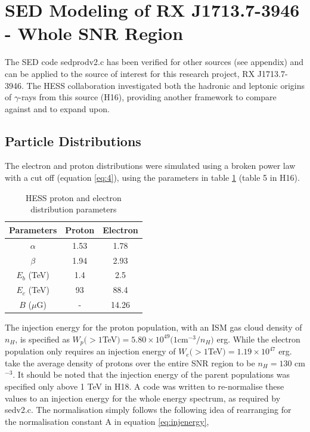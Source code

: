 \documentclass[12pt,a4paper]{article}
\begin{document}
\newpage
\section{SED Modeling of RX J1713.7-3946 - Whole SNR Region} \label{sec:seds}


The SED code sedprodv2.c has been verified for other sources (see appendix) and can be applied to the source of interest for this research project, RX J1713.7-3946. The HESS collaboration investigated both the hadronic and leptonic origins of $\gamma$-rays from this source (H16), providing another framework to compare against and to expand upon. 

\subsection{Particle Distributions}
The electron and proton distributions were simulated using a broken power law with a cut off (equation \ref{eq:4}), using the parameters in table \ref{tab:paramshess} (table 5 in H16).
\begin{table}[H] 
	\begin{center}
		\begin{tabular}{ccc}
			\toprule
			Parameters & Proton & Electron \\ 
			\hline 
			$\alpha$& 1.53 & 1.78 \\ 
			$\beta$& 1.94 & 2.93 \\ 
			$E_{b}$ (TeV)& 1.4 & 2.5 \\ 
			$E_{c}$ (TeV)& 93 & 88.4 \\ 
			$B$ ($\mu$G) & - & 14.26\\
			\bottomrule
		\end{tabular} 
	\end{center}
	\caption{HESS proton and electron distribution parameters}
	\label{tab:paramshess}
\end{table}
The injection energy for the proton population, with an ISM gas cloud density of $n_H$, is specified as $W_p(>1 $TeV$) = 5.80 \times 10^{49}(1 $cm$^{-3}/n_H)$ erg. While the electron population only requires an injection energy of $W_e(>1 $TeV$) = 1.19 \times 10^{47}$ erg. \cite{2012ApJ...746...82F} take the average density of protons over the entire SNR region to be $n_H = 130$ cm$^{-3}$. It should be noted that the injection energy of the parent populations was specified only above 1 TeV in H18. A code was written to re-normalise these values to an injection energy for the whole energy spectrum, as required by sedv2.c. The normalisation simply follows the following idea of rearranging for the normalisation constant A in equation \ref{eq:injenergy},
\end{document}
